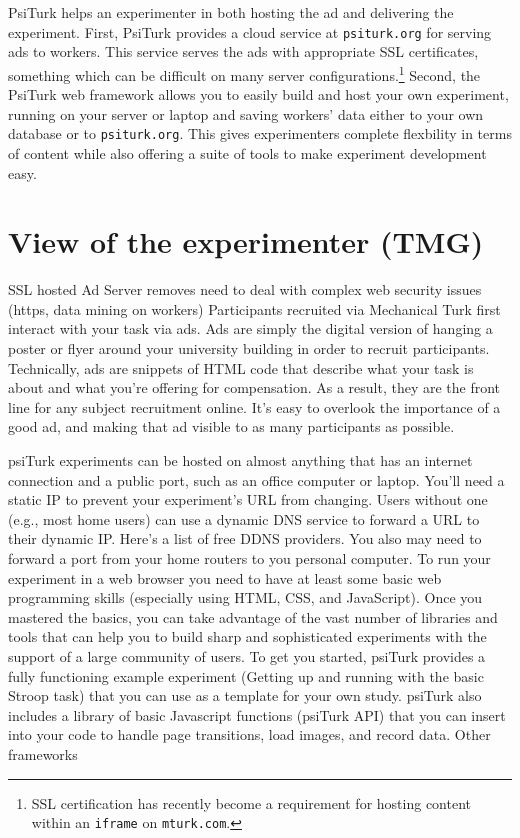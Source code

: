 \documentclass[jou,apacite]{apa6}
\begin{document}
PsiTurk helps an experimenter in both hosting the ad and delivering the experiment.
First, PsiTurk provides a cloud service at \texttt{psiturk.org} for serving ads to workers.
This service serves the ads with appropriate SSL certificates, something which can be difficult on many server configurations.\footnote{SSL certification has recently become a requirement for hosting content within an \texttt{iframe} on \texttt{mturk.com}.}
Second, the PsiTurk web framework allows you to easily build and host your own experiment, running on your server or laptop and saving workers' data either to your own database  or to \texttt{psiturk.org}.
This gives experimenters complete flexbility in terms of content while also offering a suite of tools to make experiment development easy.

\section{View of the experimenter (TMG)}
SSL hosted Ad Server removes need to deal with complex web security issues (https, data mining on workers) 
Participants recruited via Mechanical Turk first interact with your task via ads. Ads are simply the digital version of hanging a poster or flyer around your university building in order to recruit participants. Technically, ads are snippets of HTML code that describe what your task is about and what you're offering for compensation. As a result, they are the front line for any subject recruitment online. It's easy to overlook the importance of a good ad, and making that ad visible to as many participants as possible.


psiTurk experiments can be hosted on almost anything that has an internet connection and a public port, such as an office computer or laptop.
You'll need a static IP to prevent your experiment's URL from changing. 
Users without one (e.g., most home users) can use a dynamic DNS service to forward a URL to their dynamic IP.
Here's a list of free DDNS providers.
You also may need to forward a port from your home routers to you personal computer.
To run your experiment in a web browser you need to have at least some basic web programming skills (especially using HTML, CSS, and JavaScript).
Once you mastered the basics, you can take advantage of the vast number of libraries and tools that can help you to build sharp and sophisticated experiments with the support of a large community of users.
To get you started, psiTurk provides a fully functioning example experiment (Getting up and running with the basic Stroop task) that you can use as a template for your own study.
psiTurk also includes a library of basic Javascript functions (psiTurk API) that you can insert into your code to handle page transitions, load images, and record data.
Other frameworks 
\end{document}
